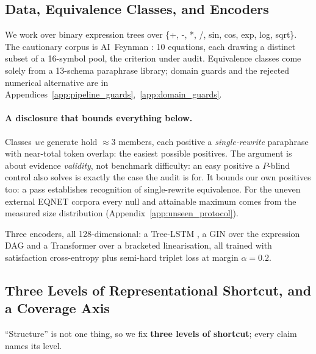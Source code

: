 \subsection{Data, Equivalence Classes, and Encoders}

We work over binary expression trees over \{+, -, *, /, sin, cos, exp, log, sqrt\}. The cautionary corpus is AI~Feynman \citep{udrescu2020ai}: 10 equations, each drawing a distinct subset of a 16-symbol pool, the criterion under audit. Equivalence classes come solely from a 13-schema paraphrase library; domain guards and the rejected numerical alternative are in Appendices~\ref{app:pipeline_guards},~\ref{app:domain_guards}.

\paragraph{A disclosure that bounds everything below.} Classes \emph{we} generate hold ${\approx}3$ members, each positive a \emph{single-rewrite} paraphrase with near-total token overlap: the easiest possible positives. The argument is about evidence \emph{validity}, not benchmark difficulty: an easy positive a $P$-blind control also solves is exactly the case the audit is for. It bounds our own positives too: a pass establishes recognition of single-rewrite equivalence. For the uneven external EQNET corpora every null and attainable maximum comes from the measured size distribution (Appendix~\ref{app:unseen_protocol}).

Three encoders, all 128-dimensional: a Tree-LSTM \citep{tai2015improved}, a GIN \citep{xu2019powerful} over the expression DAG and a Transformer \citep{vaswani2017attention} over a bracketed linearisation, all trained with satisfaction cross-entropy plus semi-hard triplet loss \citep{schroff2015facenet} at margin $\alpha{=}0.2$.

\subsection{Three Levels of Representational Shortcut, and a Coverage Axis}
\label{sec:tiers}

``Structure'' is not one thing, so we fix \textbf{three levels of shortcut}; every claim names its level.


